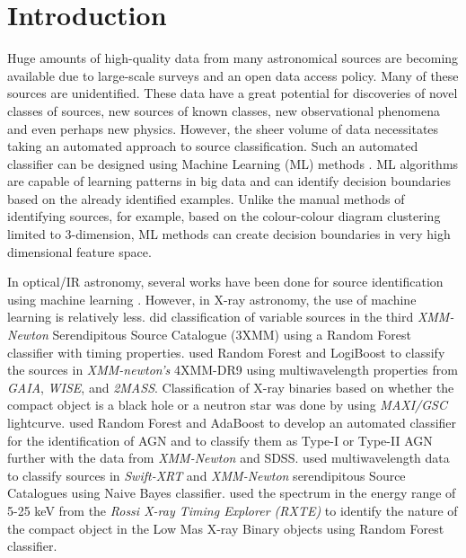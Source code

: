 \documentclass[fleqn,usenatbib]{mnras}
\begin{document}
\section{Introduction}

Huge amounts of high-quality data from many astronomical sources are becoming available due to large-scale surveys and an open data access policy.
Many of these sources are unidentified. 
These data have a great potential for discoveries of novel classes of sources, new sources of known classes, new observational phenomena and even perhaps new physics.
However, the sheer volume of data  necessitates taking an automated approach to source classification. Such an automated classifier can be designed using Machine Learning (ML) methods \citep{2010IJMPD..19.1049B}. ML algorithms are capable of learning patterns in big data and can identify decision boundaries based on the already identified examples. Unlike the manual methods of identifying sources, for example, based on the colour-colour diagram clustering limited to 3-dimension, ML methods can create decision boundaries in very high dimensional feature space. 

In optical/IR astronomy, several works have been done for source identification using machine learning \citep{2016A&A...596A..39K, 2020MNRAS.495.4135T, 2019MNRAS.488.3358T, 2021MNRAS.506..677C}. 
However, in X-ray astronomy, the use of machine learning is relatively less.
\cite{2015ApJ...813...28F}  did classification of variable sources in the third {\em XMM-Newton} Serendipitous Source Catalogue (3XMM) using a Random Forest classifier with timing properties. \citet{2021MNRAS.503.5263Z} used Random Forest and LogiBoost to classify the sources in {\em XMM-newton's}  4XMM-DR9 using multiwavelength properties from  {\em GAIA}, {\em WISE}, and {\em 2MASS}. Classification of X-ray binaries based on whether the compact object is a black hole or a neutron star was done by \citet{2022arXiv220400346D} using {\em MAXI/GSC} lightcurve. \citet{2022MNRAS.510..161F} used Random Forest and AdaBoost to develop an automated classifier for the identification of AGN and to classify them as Type-I or Type-II AGN further with the data from {\em XMM-Newton} and SDSS. \citet{2022A&A...657A.138T} used multiwavelength data to classify sources in {\em Swift-XRT} and {\em XMM-Newton} serendipitous Source Catalogues using Naive Bayes classifier. \cite{2021MNRAS.501.3457P} used the spectrum in the energy range of 5-25 keV from the {\em Rossi X-ray Timing Explorer (RXTE)} to identify the nature of the compact object in the Low Mas X-ray Binary objects using Random Forest classifier.
\end{document}
